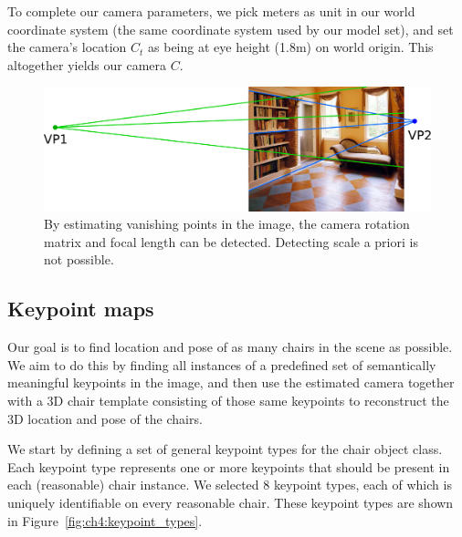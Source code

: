 \documentclass[10pt,twocolumn,letterpaper]{article}
\begin{document}
To complete our camera parameters, we pick meters as unit in our world
coordinate system (the same coordinate system used by our model set), and set
the camera's location $C_t$ as being at eye height (1.8m) on world origin. This
altogether yields our camera $C$.

\begin{figure}
    \includegraphics[width=\linewidth]{figures/camera_estimation/camera_estimation}
    \caption[Vanishing point detection]{By estimating vanishing points in the image, the camera rotation matrix and focal length can be detected. Detecting scale a priori is not possible.}
    \label{fig:ch4:camera_estimation}
\end{figure}

\subsection{Keypoint maps}
\label{sec:ch4:keypoint_maps}
Our goal is to find location and pose of as many chairs in the scene as possible.
We aim to do this by finding all instances of a predefined set of
semantically meaningful keypoints in the image, and then use the estimated camera together with a
3D chair template consisting of those same keypoints to reconstruct
the 3D location and pose of the chairs.

We start by defining a set of general keypoint types for the chair object class.
Each keypoint type represents one or more keypoints that should be present in
each (reasonable) chair instance. We selected 8 keypoint types, each of which
is uniquely identifiable on every reasonable chair. These keypoint types
are shown in Figure~\ref{fig:ch4:keypoint_types}.
\end{document}
